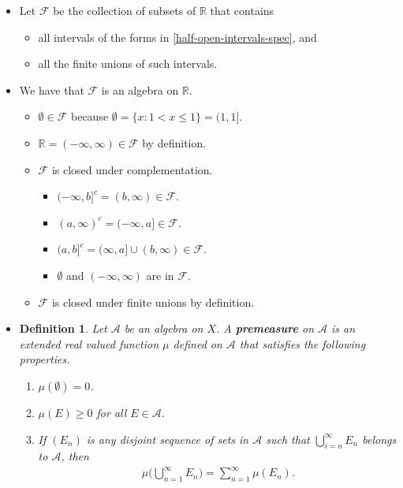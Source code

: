 \documentclass[10pt]{article}
\newtheorem{definition}[lemma]{Definition}
\newcommand{\mcal}[1]{\mathcal{#1}}
\newcommand{\Real}{\mathbb{R}}
\begin{document}
\begin{itemize}
  \item Let $\mcal{F}$ be the collection of subsets of $\Real$ that contains
  \begin{itemize}
    \item all intervals of the forms in \eqref{half-open-intervals-spec}, and
    \item all the finite unions of such intervals.
  \end{itemize}
  
  \item We have that $\mcal{F}$ is an algebra on $\Real$.
  \begin{itemize}
    \item $\emptyset \in \mcal{F}$ because $\emptyset = \{ x : 1 < x \leq 1 \} = (1,1]$.
    \item $\Real = (-\infty, \infty) \in \mcal{F}$ by definition.
    \item $\mcal{F}$ is closed under complementation.
    \begin{itemize}
      \item $(-\infty,b]^c = (b,\infty) \in \mcal{F}$.
      \item $(a,\infty)^c = (-\infty,a] \in \mcal{F}$.
      \item $(a,b]^c = (\infty,a] \cup (b,\infty) \in \mcal{F}$.
      \item $\emptyset$ and $(-\infty,\infty)$ are in $\mcal{F}$.
    \end{itemize}

    \item $\mcal{F}$ is closed under finite unions by definition.
  \end{itemize}

  \item \begin{definition}
    Let $\mcal{A}$ be an algebra on $X$. A {\bf premeasure} on $\mcal{A}$ is an extended real valued function $\mu$ defined on $\mcal{A}$ that satisfies the following properties.
    \begin{enumerate}
      \item $\mu(\emptyset) = 0$.
      \item $\mu(E) \geq 0$ for all $E \in \mcal{A}$.
      \item If $(E_n)$ is any disjoint sequence of sets in $\mcal{A}$ such that $\bigcup_{i=n}^\infty E_n$ belongs to $\mcal{A}$, then
      \begin{align*}
        \mu\bigg( \bigcup_{n=1}^\infty E_n \bigg) = \sum_{n=1}^\infty \mu(E_n).
      \end{align*}
    \end{enumerate}
  \end{definition}


\end{itemize}
\end{document}
